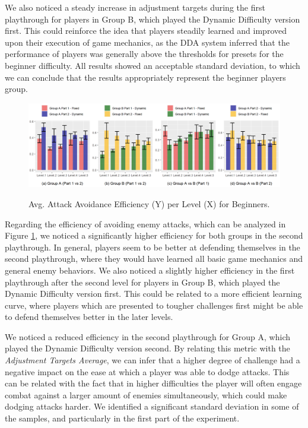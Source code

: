 We also noticed a steady increase in adjustment targets during the first playthrough for players in Group B, which played the Dynamic Difficulty version first. This could reinforce the idea that players steadily learned and improved upon their execution of game mechanics, as the DDA system inferred that the performance of players was generally above the thresholds for presets for the beginner difficulty. All results showed an acceptable standard deviation, to which we can conclude that the results appropriately represent the beginner players group. 

\begin{figure}[ht]
    \begin{center}
    \caption{Avg. Attack Avoidance Efficiency (Y) per Level (X) for Beginners.}
        \includegraphics[width=\textwidth]{figures/attack_avoidance_efficiency-beginner_players.png}
        \label{fig:result-metric-beginners-attack-avoidance-efficiency}
    \end{center}
\end{figure}

Regarding the efficiency of avoiding enemy attacks, which can be analyzed in Figure \ref{fig:result-metric-beginners-attack-avoidance-efficiency}, we noticed a significantly higher efficiency for both groups in the second playthrough. In general, players seem to be better at defending themselves in the second playthrough, where they would have learned all basic game mechanics and general enemy behaviors. We also noticed a slightly higher efficiency in the first playthrough after the second level for players in Group B, which played the Dynamic Difficulty version first. This could be related to a more efficient learning curve, where players which are presented to tougher challenges first might be able to defend themselves better in the later levels.

We noticed a reduced efficiency in the second playthrough for Group A, which played the Dynamic Difficulty version second. By relating this metric with the \emph{Adjustment Targets Average}, we can infer that a higher degree of challenge had a negative impact on the ease at which a player was able to dodge attacks. This can be related with the fact that in higher difficulties the player will often engage combat against a larger amount of enemies simultaneously, which could make dodging attacks harder. We identified a significant standard deviation in some of the samples, and particularly in the first part of the experiment.

